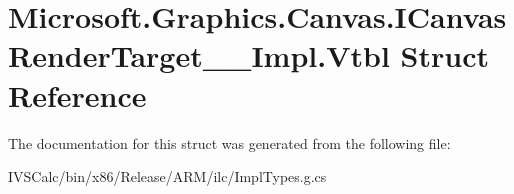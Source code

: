 \hypertarget{struct_microsoft_1_1_graphics_1_1_canvas_1_1_i_canvas_render_target_____impl_1_1_vtbl}{}\section{Microsoft.\+Graphics.\+Canvas.\+I\+Canvas\+Render\+Target\+\_\+\+\_\+\+Impl.\+Vtbl Struct Reference}
\label{struct_microsoft_1_1_graphics_1_1_canvas_1_1_i_canvas_render_target_____impl_1_1_vtbl}


The documentation for this struct was generated from the following file\+:\begin{DoxyCompactItemize}
\item 
I\+V\+S\+Calc/bin/x86/\+Release/\+A\+R\+M/ilc/Impl\+Types.\+g.\+cs\end{DoxyCompactItemize}
